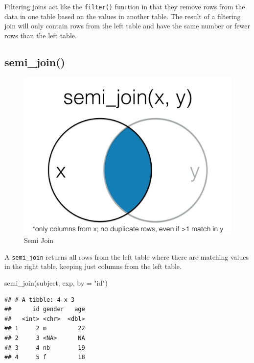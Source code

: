 \documentclass[
  oneside]{book}
\newenvironment{Shaded}{\begin{snugshade}}{\end{snugshade}}
\newcommand{\AttributeTok}[1]{\textcolor[rgb]{0.77,0.63,0.00}{#1}}
\newcommand{\FunctionTok}[1]{\textcolor[rgb]{0.00,0.00,0.00}{#1}}
\newcommand{\NormalTok}[1]{#1}
\newcommand{\StringTok}[1]{\textcolor[rgb]{0.31,0.60,0.02}{#1}}
\begin{document}
Filtering joins act like the \texttt{filter()} function in that they remove rows from the data in one table based on the values in another table. The result of a filtering join will only contain rows from the left table and have the same number or fewer rows than the left table.

\hypertarget{semi_join}{%
\subsection{semi\_join()}\label{semi_join}}

\begin{figure}

{\centering \includegraphics[width=1\linewidth]{images/joins/semi_join} 

}

\caption{Semi Join}\label{fig:img-semi-join}
\end{figure}

A \texttt{semi\_join} returns all rows from the left table where there are matching values in the right table, keeping just columns from the left table.

\begin{Shaded}
\begin{Highlighting}[]
\FunctionTok{semi\_join}\NormalTok{(subject, exp, }\AttributeTok{by =} \StringTok{"id"}\NormalTok{)}
\end{Highlighting}
\end{Shaded}

\begin{verbatim}
## # A tibble: 4 x 3
##      id gender   age
##   <int> <chr>  <dbl>
## 1     2 m         22
## 2     3 <NA>      NA
## 3     4 nb        19
## 4     5 f         18
\end{verbatim}
\end{document}
